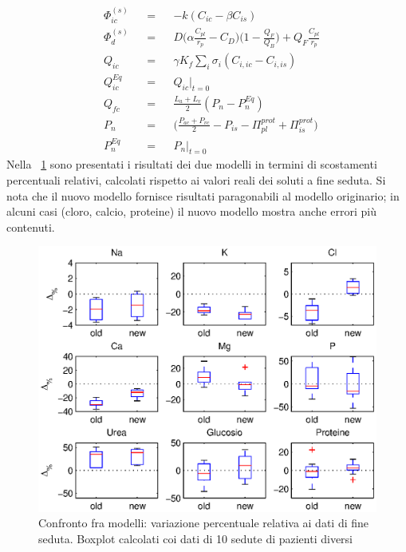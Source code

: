 \begin{align*}
		&\Phi_{ic}^{(s)}& &=& &-k(C_{ic} - \beta C_{is}) \\
		&\Phi_d^{(s)}&    &=& &D\biggl(\alpha \frac{C_{pl}}{r_p}-C_D\biggr)\biggl(1-\frac{Q_F}{Q_B}\biggr)+Q_F \frac{C_{pl}}{r_p} \\
		&Q_{ic}&          &=& &\gamma K_f \sum_i{\sigma_i(C_{i,ic}-C_{i,is})} \\
		&Q_{ic}^{Eq}&     &=& &Q_{ic} \lvert_{t=0} \\
		&Q_{fc}&          &=& &\frac{L_a+L_v}{2}(P_n - P_n^{Eq})\\
		&P_n&             &=& &\biggl(\frac{P_{ac}+P_{vc}}{2} - P_{is} - \Pi_{pl}^{prot} + \Pi_{is}^{prot}\biggr)\\
		&P_n^{Eq}&        &=& &P_n\lvert_{t=0}			
\end{align*}
\newline
\noindent
Nella \figurename~\ref{LUNIvsST} sono presentati i risultati dei due modelli in termini di scostamenti percentuali relativi, calcolati rispetto ai valori reali dei soluti a fine seduta. Si nota che il nuovo modello fornisce risultati paragonabili al modello originario; in alcuni casi (cloro, calcio, proteine) il nuovo modello mostra anche errori più contenuti.


\begin{figure}[htbp]
	\centering
		\includegraphics[width=\textwidth]{immagini/LUNIvsST.eps}
	\caption{Confronto fra modelli: variazione percentuale relativa ai dati di fine seduta. Boxplot calcolati coi dati di 10 sedute di pazienti diversi}
	\label{LUNIvsST}
\end{figure}
